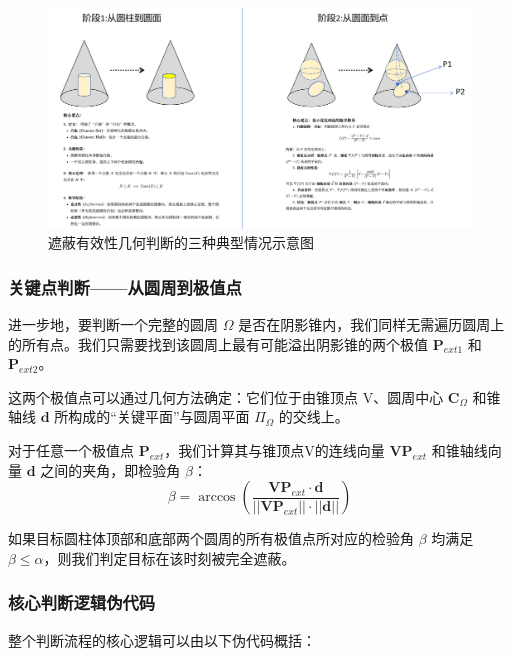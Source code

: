 \documentclass[fontset=SimSun]{ctexart}
\begin{document}
\begin{figure}[H]
    \centering
    \includegraphics[width=\textwidth]{8.凸包理论阶段2-3示意图.png}
    \caption{遮蔽有效性几何判断的三种典型情况示意图}
    \label{凸包理论模型降维与圆周极值点解析示意图}
\end{figure}

\subsubsection{关键点判断——从圆周到极值点}
进一步地，要判断一个完整的圆周 $\Omega$ 是否在阴影锥内，我们同样无需遍历圆周上的所有点。我们只需要找到该圆周上最有可能溢出阴影锥的两个极值 $\mathbf{P}_{ext1}$ 和 $\mathbf{P}_{ext2}$。

这两个极值点可以通过几何方法确定：它们位于由锥顶点 V、圆周中心 $\mathbf{C}_{\Omega}$ 和锥轴线 $\mathbf{d}$ 所构成的“关键平面”与圆周平面 $\Pi_{\Omega}$ 的交线上。

对于任意一个极值点 $\mathbf{P}_{ext}$，我们计算其与锥顶点V的连线向量 $\mathbf{V}\mathbf{P}_{ext}$ 和锥轴线向量 $\mathbf{d}$ 之间的夹角，即检验角 $\beta$：
\begin{equation}
\beta = \arccos\left( \frac{\mathbf{V}\mathbf{P}_{ext} \cdot \mathbf{d}}{||\mathbf{V}\mathbf{P}_{ext}|| \cdot ||\mathbf{d}||} \right)
\end{equation}

如果目标圆柱体顶部和底部两个圆周的所有极值点所对应的检验角 $\beta$ 均满足 $\beta \le \alpha$，则我们判定目标在该时刻被完全遮蔽。

\subsubsection{核心判断逻辑伪代码}
整个判断流程的核心逻辑可以由以下伪代码概括：
\end{document}
